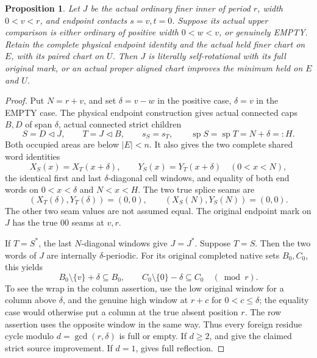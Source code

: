 \documentclass[11pt,a4paper]{amsart}
\numberwithin{equation}{section}
\theoremstyle{plain}
\newtheorem{proposition}[theorem]{Proposition}
\theoremstyle{definition}
\newcommand{\spn}{\operatorname{sp}}
\begin{document}
\begin{proposition}\label{ge:endpoint-splice}
Let \(J\) be the actual ordinary finer inner of period \(r\),
width \(0<v<r\), and endpoint contacts \(s=v,t=0\).  Suppose
its actual upper comparison is either ordinary of positive width
\(0<w<v\), or genuinely EMPTY.  Retain the complete physical endpoint
identity and the actual held finer chart on \(E\), with its paired
chart on \(U\).  Then \(J\) is literally self-rotational with its
full original mark, or an actual proper aligned chart improves the
minimum held on \(E\) and \(U\).
\end{proposition}
\begin{proof}
Put \(N=r+v\), and set \(\delta=v-w\) in the positive case,
\(\delta=v\) in the EMPTY case.  The physical endpoint construction
 gives actual connected caps \(B,D\) of
span \(\delta\), actual connected strict children
\[
 S=D\mathbin{\triangleleft}J,\qquad
 T=J\mathbin{\triangleleft}B,\qquad s_S=s_T,
 \qquad \spn S=\spn T=N+\delta=:H.
\]
Both occupied areas are below \(|E|<n\).  It also gives the two
complete shared word identities
\begin{equation}\label{ge:eq:splice-shared}
 X_S(x)=X_T(x+\delta),\qquad
 Y_S(x)=Y_T(x+\delta)\quad(0<x<N),
\end{equation}
the identical first and last \(\delta\)-diagonal cell windows,
and equality of both end words on \(0<x<\delta\) and \(N<x<H\).
The two true splice seams are
\begin{equation}\label{ge:eq:splice-seams}
 (X_T(\delta),Y_T(\delta))=(0,0),\qquad
 (X_S(N),Y_S(N))=(0,0).
\end{equation}
The other two seam values are not assumed equal.  The original endpoint
mark on \(J\) has the true \(00\) seams at \(v,r\).

If \(T=S^*\), the last \(N\)-diagonal windows give \(J=J^*\).
Suppose \(T=S\).  Then the two words of \(J\) are internally
\(\delta\)-periodic.  For its original completed native sets \(B_0,C_0\),
this yields
\[
 B_0\setminus\{v\}+\delta\subseteq B_0,\qquad
 C_0\setminus\{0\}-\delta\subseteq C_0\quad(\bmod r).
\]
To see the wrap in the column assertion, use the low original window
for a column above \(\delta\), and the genuine high window at
\(r+c\) for \(0<c\le\delta\); the equality case would otherwise
put a column at the true absent position \(r\).  The row assertion
uses the opposite window in the same way.  Thus every foreign residue
cycle modulo \(d=\gcd(r,\delta)\) is full or empty.  If \(d\ge2\),
\cite[Ordinary residue fold]{Shields2026Gluing} and  give the claimed
strict source improvement.  If \(d=1\),
 gives full reflection.


\end{proof}
\end{document}
